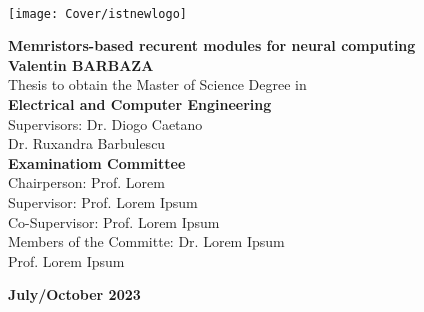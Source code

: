 \setcounter{page}{1} 


\thispagestyle{empty}
\begin{flushleft}
  ~\\ \vspace{-12mm} \hspace{-12mm}
  \texttt{[image: Cover/istnewlogo]}
  \vspace{10mm}
  \\ \begin{center}
  \end{center} %

  \vspace{5mm}
  \centering
  \LARGE \textbf{Memristors-based recurent modules for neural computing}
  \\ \vspace{15mm}
  \Large \textbf{Valentin BARBAZA} \\
  \vspace{12mm}
  \large Thesis to obtain the Master of Science Degree in
  \\ \vspace{2mm}
  \LARGE \textbf{Electrical and Computer Engineering}
  \\ \vspace{10mm}
  \large Supervisors: Dr. Diogo Caetano \\
  \large Dr. Ruxandra Barbulescu
  \\ \vspace{15mm}
  \Large \textbf{Examinatiom Committee}
  \\ \vspace{5mm}
  \large Chairperson: Prof. Lorem \\
  \large Supervisor: Prof. Lorem Ipsum\\
  \large Co-Supervisor: Prof. Lorem Ipsum \\
  \large Members of the Committe: Dr. Lorem Ipsum \\
  Prof. Lorem Ipsum

  \vspace{10mm}

  \Large \textbf{July/October 2023} \\
  \let\thepage\relax
\end{flushleft}
\pagebreak


